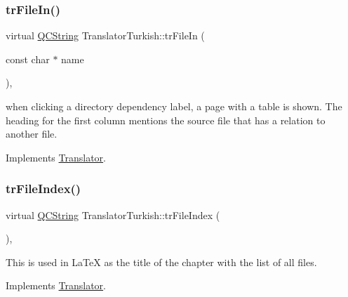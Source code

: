 \mbox{\label{class_translator_turkish_add0665e9dea47ca2d5a99afc4b9da1af}} 
\subsubsection{\texorpdfstring{trFileIn()}{trFileIn()}}
{\footnotesize\ttfamily virtual \mbox{\hyperlink{class_q_c_string}{Q\+C\+String}} Translator\+Turkish\+::tr\+File\+In (\begin{DoxyParamCaption}\item[{const char $\ast$}]{name }\end{DoxyParamCaption})\hspace{0.3cm}{\ttfamily [inline]}, {\ttfamily [virtual]}}

when clicking a directory dependency label, a page with a table is shown. The heading for the first column mentions the source file that has a relation to another file. 

Implements \mbox{\hyperlink{class_translator}{Translator}}.

\mbox{\label{class_translator_turkish_a2803e35005a384cf36f6b98c04a274f4}} 
\subsubsection{\texorpdfstring{trFileIndex()}{trFileIndex()}}
{\footnotesize\ttfamily virtual \mbox{\hyperlink{class_q_c_string}{Q\+C\+String}} Translator\+Turkish\+::tr\+File\+Index (\begin{DoxyParamCaption}{ }\end{DoxyParamCaption})\hspace{0.3cm}{\ttfamily [inline]}, {\ttfamily [virtual]}}

This is used in La\+TeX as the title of the chapter with the list of all files. 

Implements \mbox{\hyperlink{class_translator}{Translator}}.

\mbox{\label{class_translator_turkish_a1767a6bc5e08f5afd10ffc8a7e92dc29}} 
